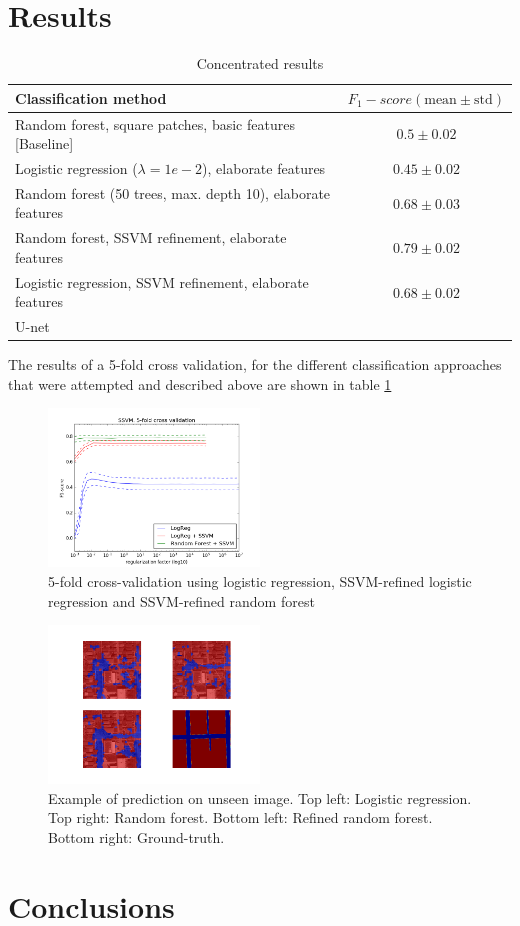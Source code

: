 \documentclass[10pt,conference,compsocconf]{IEEEtran}
\begin{document}
	\section{Results}
		\begin{table}
		\begin{tabular}{p{} c}		
			\textbf{Classification method} &  \textbf{$F_1-score (\text{mean}\pm \text{std})$}\\
			\hline \hline
			 Random forest, square patches, basic features [Baseline] & $0.5 \pm 0.02$ \\ \hline
			Logistic regression ($\lambda = 1e-2$), elaborate features& $0.45 \pm 0.02$ \\ \hline
			Random forest (50 trees, max. depth 10), elaborate features& $0.68 \pm 0.03$ \\ \hline
			Random forest, SSVM refinement, elaborate features & $0.79 \pm 0.02$ \\ \hline
			Logistic regression, SSVM refinement, elaborate features& $0.68 \pm 0.02$ \\ \hline
			U-net & $ $ \\
			\hline
		\end{tabular}
		\caption{\label{table:results}Concentrated results}
		\end{table}
	The results of a 5-fold cross validation, for the different classification
  approaches that were attempted and described above are shown in table \ref{table:results}
	\begin{figure}[h]
		\centering
		\includegraphics[width=0.5\textwidth]{pics/cross_val_ssvm.png}
		\caption{5-fold cross-validation using logistic regression, SSVM-refined
      logistic regression and SSVM-refined random forest}
		\label{fig:example}
	\end{figure}
		\begin{figure}[h]
			\centering
			\includegraphics[width=0.5\textwidth]{pics/prediction.png}
			\caption{Example of prediction on unseen image. Top left: Logistic
        regression. Top right: Random forest. Bottom left: Refined random
        forest. Bottom right: Ground-truth.}
			\label{fig:predictions}
		\end{figure}
	\section{Conclusions}
	
	
	
\end{document}
